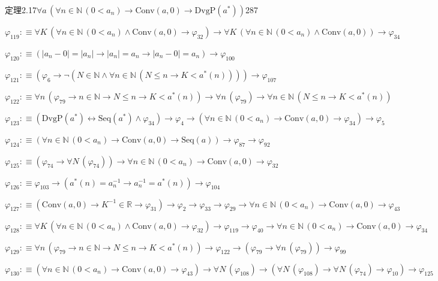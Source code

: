 \begin{fullproof}{定理2.17}{$\forall a\,(\forall n \in \mathbb{N}\,(0 < a_{n}) \to \mathrm{Conv}(a,0) \to \mathrm{DvgP}(a^{\ast}))$}{287}
\begin{abbrevlist}
\item $\varphi_{119} :\equiv \forall K\,(\forall n \in \mathbb{N}\,(0 < a_{n}) \land \mathrm{Conv}(a,0) \to \varphi_{32}) \to \forall K\,(\forall n \in \mathbb{N}\,(0 < a_{n}) \land \mathrm{Conv}(a,0)) \to \varphi_{34}$
\item $\varphi_{120} :\equiv (\lvert a_{n} - 0 \rvert = \lvert a_{n} \rvert \to \lvert a_{n} \rvert = a_{n} \to \lvert a_{n} - 0 \rvert = a_{n}) \to \varphi_{100}$
\item $\varphi_{121} :\equiv (\varphi_{6} \to \neg (N \in \mathbb{N} \land \forall n \in \mathbb{N}\,(N \leq n \to K < a^{\ast}(n)))) \to \varphi_{107}$
\item $\varphi_{122} :\equiv \forall n\,(\varphi_{79} \to n \in \mathbb{N} \to N \leq n \to K < a^{\ast}(n)) \to \forall n\,(\varphi_{79}) \to \forall n \in \mathbb{N}\,(N \leq n \to K < a^{\ast}(n))$
\item $\varphi_{123} :\equiv (\mathrm{DvgP}(a^{\ast}) \leftrightarrow \mathrm{Seq}(a^{\ast}) \land \varphi_{34}) \to \varphi_{4} \to (\forall n \in \mathbb{N}\,(0 < a_{n}) \to \mathrm{Conv}(a,0) \to \varphi_{34}) \to \varphi_{5}$
\item $\varphi_{124} :\equiv (\forall n \in \mathbb{N}\,(0 < a_{n}) \to \mathrm{Conv}(a,0) \to \mathrm{Seq}(a)) \to \varphi_{87} \to \varphi_{92}$
\item $\varphi_{125} :\equiv (\varphi_{74} \to \forall N\,(\varphi_{74})) \to \forall n \in \mathbb{N}\,(0 < a_{n}) \to \mathrm{Conv}(a,0) \to \varphi_{32}$
\item $\varphi_{126} :\equiv \varphi_{103} \to (a^{\ast}(n) = a_{n}^{-1} \to a_{n}^{-1} = a^{\ast}(n)) \to \varphi_{104}$
\item $\varphi_{127} :\equiv (\mathrm{Conv}(a,0) \to K^{-1} \in \mathbb{R} \to \varphi_{31}) \to \varphi_{2} \to \varphi_{33} \to \varphi_{29} \to \forall n \in \mathbb{N}\,(0 < a_{n}) \to \mathrm{Conv}(a,0) \to \varphi_{43}$
\item $\varphi_{128} :\equiv \forall K\,(\forall n \in \mathbb{N}\,(0 < a_{n}) \land \mathrm{Conv}(a,0) \to \varphi_{32}) \to \varphi_{119} \to \varphi_{40} \to \forall n \in \mathbb{N}\,(0 < a_{n}) \to \mathrm{Conv}(a,0) \to \varphi_{34}$
\item $\varphi_{129} :\equiv \forall n\,(\varphi_{79} \to n \in \mathbb{N} \to N \leq n \to K < a^{\ast}(n)) \to \varphi_{122} \to (\varphi_{79} \to \forall n\,(\varphi_{79})) \to \varphi_{99}$
\item $\varphi_{130} :\equiv (\forall n \in \mathbb{N}\,(0 < a_{n}) \to \mathrm{Conv}(a,0) \to \varphi_{43}) \to \forall N\,(\varphi_{108}) \to (\forall N\,(\varphi_{108}) \to \forall N\,(\varphi_{74}) \to \varphi_{10}) \to \varphi_{125}$
\end{abbrevlist}
\end{fullproof}
